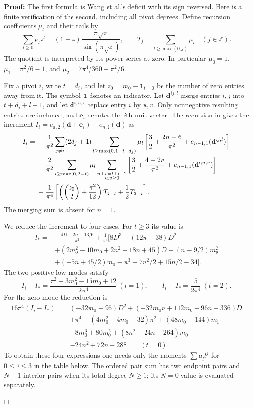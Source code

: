 \documentclass[a4paper,10pt]{article}
\numberwithin{equation}{section}
\theoremstyle{paperplain}
\theoremstyle{paperremark}
\theoremstyle{paperplain}
\newenvironment{prf}{\noindent \textbf{Proof: }}{\hfill $\mdlgwhtsquare$\par\addvspace{0.5\baselineskip}}
\begin{document}
\begin{prf}
The first formula is Wang et al.'s deficit with its sign reversed. Here is a
finite verification of the second, including all pivot degrees. Define
recursion coefficients $\mu_l$ and their tails by
\begin{equation}\label{eq:a:recursion-kernel}
 \sum_{l\geq0}\mu_l z^l
 =(1-z)\frac{\pi\sqrt z}{\sin(\pi\sqrt z)},\qquad
 T_j=\sum_{l\geq\max(0,j)}\mu_l\quad(j\in\mathbb Z).
\end{equation}
The quotient is interpreted by its power series at zero. In particular
$\mu_0=1$, $\mu_1=\pi^2/6-1$, and
$\mu_2=7\pi^4/360-\pi^2/6$.

Fix a pivot $i$, write $t=d_i$, and let $z_0=m_0-\mathbf1_{t=0}$ be
the number of zero entries away from it. The symbol $\mathbf1$ denotes
an indicator. Let $\mathbf d^{ij,l}$ merge entries $i,j$ into
$t+d_j+l-1$, and let $\mathbf d^{i;u,v}$ replace entry $i$ by $u,v$.
Only nonnegative resulting entries are included, and $\mathbf e_i$
denotes the $i$th unit vector. The recursion in
\cite[(C.1)--(C.3)]{W26}
gives the increment $I_i=e_{n,2}(\mathbf d+\mathbf e_i)-e_{n,2}(\mathbf d)$
as
\begin{align}
 I_i={}&-\frac1{\pi^2}\sum_{j\ne i}(2d_j+1)
  \sum_{l\geq\max(0,1-t-d_j)}\mu_l
  \left[\frac32+\frac{2n-6}{\pi^2}
                 +e_{n-1,1}(\mathbf d^{ij,l})\right]\notag\\
 &-\frac2{\pi^2}\sum_{l\geq\max(0,2-t)}\mu_l
  \sum_{\substack{u+v=t+l-2\\u,v\geq0}}
  \left[\frac32+\frac{4-2n}{\pi^2}
                 +e_{n+1,1}(\mathbf d^{i;u,v})\right]\notag\\
 &-\frac1{\pi^4}
 \left[\left(\binom{z_0}{2}+\frac{\pi^2}{12}\right)T_{2-t}
                                      +\frac12 T_{3-t}\right].
 \label{eq:a:second-increment}
\end{align}
The merging sum is absent for $n=1$.

We reduce the increment to four cases. For $t\geq3$ its value is
\begin{align*}
 I_*={}&-\frac{4D+2n-13/6}{\pi^2}+\frac1{\pi^4}
 \bigl[8D^3+(12n-38)D^2\\
 &+(2m_0^2-10m_0+2n^2-18n+45)D
 +(n-9/2)m_0^2\\
 &+(-5n+45/2)m_0-n^3+7n^2/2+15n/2-34\bigr].
\end{align*}
The two positive low modes satisfy
\[
 I_i-I_*=\frac{\pi^2+3m_0^2-15m_0+12}{2\pi^4}\ (t=1),\qquad
 I_i-I_*=\frac5{2\pi^4}\ (t=2).
\]
For the zero mode the reduction is
\begin{align*}
 16\pi^4(I_i-I_*)={}&(-32m_0+96)D^2
 +(-32m_0n+112m_0+96n-336)D\\
 &+\pi^4+(4m_0^2-4m_0-32)\pi^2
 +(48m_0-144)m_1\\
 &-8m_0^3+80m_0^2+(8n^2-24n-264)m_0\\
 &-24n^2+72n+288\qquad(t=0).
\end{align*}
To obtain these four expressions one needs only the moments
$\sum\mu_l l^j$ for $0\leq j\leq3$ in the table below. The ordered
pair sum has two endpoint pairs and $N-1$ interior pairs when its total
degree $N\geq1$; its $N=0$ value is evaluated separately.


\end{prf}
\end{document}
